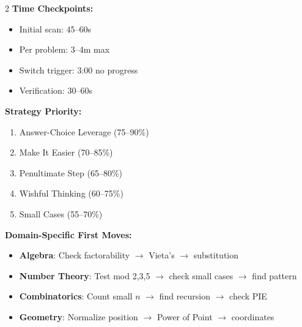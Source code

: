 \documentclass{article}
\begin{document}
\begin{tcolorbox}[colback=strategyGold!5, colframe=strategyGold!75!black, title={\textbf{AMC12 P21--25 Quick Reference}}, fonttitle=\bfseries]
\begin{multicols}{2}
\textbf{Time Checkpoints:}
\begin{itemize}[nosep, leftmargin=*]
\item Initial scan: 45--60s
\item Per problem: 3--4m max
\item Switch trigger: 3:00 no progress
\item Verification: 30--60s
\end{itemize}

\textbf{Strategy Priority:}
\begin{enumerate}[nosep, leftmargin=*]
\item Answer-Choice Leverage (75--90\%)
\item Make It Easier (70--85\%)
\item Penultimate Step (65--80\%)
\item Wishful Thinking (60--75\%)
\item Small Cases (55--70\%)
\end{enumerate}
\end{multicols}

\textbf{Domain-Specific First Moves:}
\begin{itemize}[nosep]
\item \textbf{Algebra}: Check factorability $\to$ Vieta's $\to$ substitution
\item \textbf{Number Theory}: Test mod 2,3,5 $\to$ check small cases $\to$ find pattern
\item \textbf{Combinatorics}: Count small $n$ $\to$ find recursion $\to$ check PIE
\item \textbf{Geometry}: Normalize position $\to$ Power of Point $\to$ coordinates
\end{itemize}
\end{tcolorbox}
\end{document}
